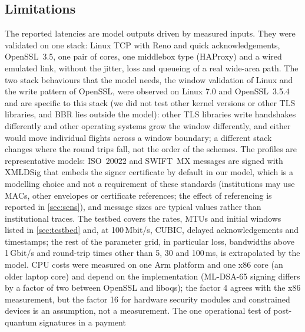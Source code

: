 \documentclass[preprint,12pt]{elsarticle}
\newcommand{\ms}{\,ms\xspace}
\begin{document}
\subsection{Limitations}
The reported latencies are model outputs driven by measured inputs. They were validated on one stack: Linux TCP with Reno and quick acknowledgements, OpenSSL~3.5, one pair of cores, one middlebox type (HAProxy) and a wired emulated link, without the jitter, loss and queueing of a real wide-area path. The two stack behaviours that the model needs, the window validation of Linux and the write pattern of OpenSSL, were observed on Linux 7.0 and OpenSSL~3.5.4 and are specific to this stack (we did not test other kernel versions or other TLS libraries, and BBR lies outside the model): other TLS libraries write handshakes differently and other operating systems grow the window differently, and either would move individual flights across a window boundary; a different stack changes where the round trips fall, not the order of the schemes.  The profiles are representative models: ISO~20022 and SWIFT~MX messages are signed with XMLDSig that embeds the signer certificate by default in our model, which is a modelling choice and not a requirement of these standards (institutions may use MACs, other envelopes or certificate references; the effect of referencing is reported in \cref{sec:sens}), and message sizes are typical values rather than institutional traces. The testbed covers the rates, MTUs and initial windows listed in \cref{sec:testbed} and, at 100\,Mbit/s, CUBIC, delayed acknowledgements and timestamps; the rest of the parameter grid, in particular loss, bandwidths above 1\,Gbit/s and round-trip times other than 5, 30 and 100\ms, is extrapolated by the model. CPU costs were measured on one Arm platform and one x86 core (an older laptop core) and depend on the implementation (ML-DSA-65 signing differs by a factor of two between OpenSSL and liboqs); the factor 4 agrees with the x86 measurement, but the factor 16 for hardware security modules and constrained devices is an assumption, not a measurement.  The one operational test of post-quantum signatures in a payment 
\end{document}
